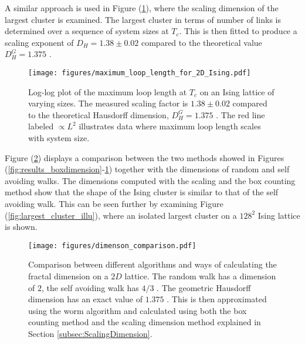 \newpage

A similar approach is used in Figure (\ref{fig:results_maxloopdimension}), where the scaling dimension of the largest cluster is examined. The largest cluster in terms of number of links is determined over a sequence of system sizes at $T_c$. This is then fitted to produce a scaling exponent of $D_H = 1.38 \pm 0.02$ compared to the theoretical value $D_H^G = 1.375$ \cite{Duplantier:GeoHausdorff}.


\begin{figure}[h!]
    \centering
        \texttt{[image: figures/maximum\_loop\_length\_for\_2D\_Ising.pdf]}
    \caption{Log-log plot of the maximum loop length at $T_c$ on an Ising lattice of varying sizes. The measured scaling factor is $1.38 \pm 0.02$ compared to the theoretical Hausdorff dimension, $D_H^G = 1.375$ \cite{Duplantier:GeoHausdorff}. The red line labeled $\propto L^2$ illustrates data where maximum loop length scales with system size.}
    \label{fig:results_maxloopdimension}
\end{figure}

\newpage

Figure (\ref{fig:comparsion_2d_lattice_dimensions}) displays a comparison between the two methods showed in Figures (\ref{fig:results_boxdimension}-\ref{fig:results_maxloopdimension}) together with the dimensions of random and self avoiding walks. The dimensions computed with the scaling and the box counting method show that the shape of the Ising cluster is similar to that of the self avoiding walk. This can be seen further by examining Figure (\ref{fig:largest_cluster_illu}), where an isolated largest cluster on a $128^2$ Ising lattice is shown.

\begin{figure}[h!]
    \centering
        \texttt{[image: figures/dimenson\_comparison.pdf]}
    \caption{Comparison between different algorithms and ways of calculating the fractal dimension on a $2D$ lattice. The random walk has a dimension of $2$, the self avoiding walk has $4/3$ \cite{Vilgis:FlorySAW}. The geometric Hausdorff dimension has an exact value of $1.375$ \cite{Duplantier:GeoHausdorff}. This is then approximated using the worm algorithm and calculated using both the box counting method and the scaling dimension method explained in Section \ref{subsec:ScalingDimension}.}
    \label{fig:comparsion_2d_lattice_dimensions}
\end{figure}

\newpage

